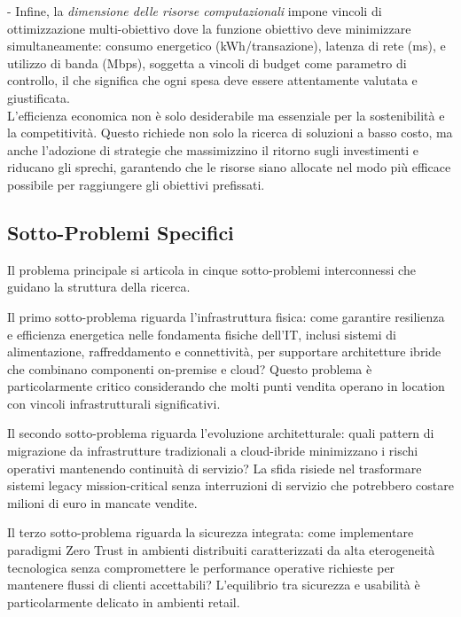 \documentclass[12pt,a4paper,oneside]{book}
\numberwithin{figure}{chapter} %
\numberwithin{table}{chapter}  %
\begin{document}
- Infine, la \emph{dimensione delle risorse computazionali} impone vincoli di ottimizzazione multi-obiettivo dove la funzione obiettivo deve minimizzare simultaneamente: consumo energetico (kWh/transazione), latenza di rete (ms), e utilizzo di banda (Mbps), soggetta a vincoli di budget come parametro di controllo, il che significa che ogni spesa deve essere attentamente valutata e giustificata.\\
L'efficienza economica non è solo desiderabile ma essenziale per la
sostenibilità e la competitività. Questo richiede non solo la ricerca di
soluzioni a basso costo, ma anche l'adozione di strategie che
massimizzino il ritorno sugli investimenti e riducano gli sprechi,
garantendo che le risorse siano allocate nel modo più efficace possibile
per raggiungere gli obiettivi prefissati.

\subsection{\texorpdfstring{\textbf{Sotto-Problemi
Specifici}}{1.2.2 Sotto-Problemi Specifici}}\label{sotto-problemi-specifici}

Il problema principale si articola in cinque sotto-problemi
interconnessi che guidano la struttura della ricerca.

Il primo sotto-problema riguarda l'infrastruttura fisica: come garantire
resilienza e efficienza energetica nelle fondamenta fisiche dell'IT,
inclusi sistemi di alimentazione, raffreddamento e connettività, per
supportare architetture ibride che combinano componenti on-premise e
cloud? Questo problema è particolarmente critico considerando che molti
punti vendita operano in location con vincoli infrastrutturali
significativi.

Il secondo sotto-problema riguarda l'evoluzione architetturale: quali
pattern di migrazione da infrastrutture tradizionali a cloud-ibride
minimizzano i rischi operativi mantenendo continuità di servizio? La
sfida risiede nel trasformare sistemi legacy mission-critical senza
interruzioni di servizio che potrebbero costare milioni di euro in
mancate vendite.

Il terzo sotto-problema riguarda la sicurezza integrata: come
implementare paradigmi Zero Trust in ambienti distribuiti caratterizzati
da alta eterogeneità tecnologica senza compromettere le performance
operative richieste per mantenere flussi di clienti accettabili?
L'equilibrio tra sicurezza e usabilità è particolarmente delicato in
ambienti retail.
\end{document}
